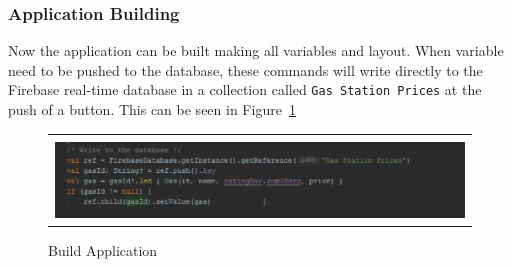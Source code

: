 \documentclass[conference]{IEEEtran}
\begin{document}
\subsubsection{Application Building}
Now the application can be built making all variables and layout.  When variable need to be pushed to the database, these commands will write directly to the Firebase real-time database in a collection called \texttt{Gas Station Prices} at the push of a button.   This can be seen in Figure~\ref{fig:Step4}
\begin{figure}[h] %
\begin{tabular}{| p{}|}
\hline
\\
\begin{center} \includegraphics[scale=.5]{../graphics/Step4.png} \end{center}\\
\hline
\end{tabular}	
	\caption{Build Application}
	\label{fig:Step4}
\end{figure} 
\end{document}
